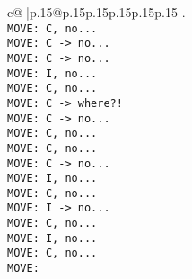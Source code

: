 \documentclass{article}
\begin{document}
{\begin{supertabular}{c@{$\;$}|p{.15\linewidth}@{}p{.15\linewidth}p{.15\linewidth}p{.15\linewidth}p{.15\linewidth}p{.15\linewidth}}
{{{.\\ \tt  MOVE: C, no...\\ \tt  MOVE: C -> no...\\ \tt  MOVE: C -> no...\\ \tt  MOVE: I, no...\\ \tt  MOVE: C, no...\\ \tt  MOVE: C -> where?!\\ \tt  MOVE: C -> no...\\ \tt  MOVE: C, no...\\ \tt  MOVE: C, no...\\ \tt  MOVE: C -> no...\\ \tt  MOVE: I, no...\\ \tt  MOVE: C, no...\\ \tt  MOVE: I -> no...\\ \tt  MOVE: C, no...\\ \tt  MOVE: I, no...\\ \tt  MOVE: C, no...\\ \tt  MOVE: }}}
\end{supertabular}}
\end{document}
